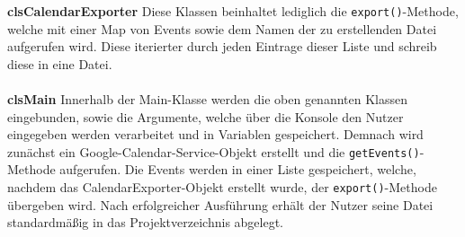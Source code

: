 \documentclass[a4paper]{article}
\begin{document}
	\textbf{clsCalendarExporter} Diese Klassen beinhaltet lediglich die \texttt{export()}-Methode, welche mit einer Map von Events sowie dem Namen der zu erstellenden Datei aufgerufen wird. Diese iterierter durch jeden Eintrage dieser Liste und schreib diese in eine Datei.
	\\
	\\
	\textbf{clsMain} Innerhalb der Main-Klasse werden die oben genannten Klassen eingebunden, sowie die Argumente, welche über die Konsole den Nutzer eingegeben werden verarbeitet und in Variablen gespeichert. Demnach wird zunächst ein Google-Calendar-Service-Objekt erstellt und die \texttt{getEvents()}-Methode aufgerufen. Die Events werden in einer Liste gespeichert, welche, nachdem das CalendarExporter-Objekt erstellt wurde, der \texttt{export()}-Methode übergeben wird. Nach erfolgreicher Ausführung erhält der Nutzer seine Datei standardmäßig in das Projektverzeichnis abgelegt.
	
\end{document}
